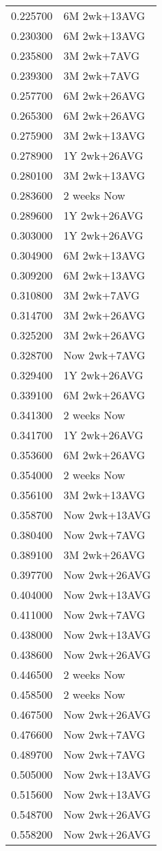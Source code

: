\begin{tabular}{rl}
0.225700 & 6M 2wk+13AVG \\
0.230300 & 6M 2wk+13AVG \\
0.235800 & 3M 2wk+7AVG \\
0.239300 & 3M 2wk+7AVG \\
0.257700 & 6M 2wk+26AVG \\
0.265300 & 6M 2wk+26AVG \\
0.275900 & 3M 2wk+13AVG \\
0.278900 & 1Y 2wk+26AVG \\
0.280100 & 3M 2wk+13AVG \\
0.283600 & 2 weeks Now \\
0.289600 & 1Y 2wk+26AVG \\
0.303000 & 1Y 2wk+26AVG \\
0.304900 & 6M 2wk+13AVG \\
0.309200 & 6M 2wk+13AVG \\
0.310800 & 3M 2wk+7AVG \\
0.314700 & 3M 2wk+26AVG \\
0.325200 & 3M 2wk+26AVG \\
0.328700 & Now 2wk+7AVG \\
0.329400 & 1Y 2wk+26AVG \\
0.339100 & 6M 2wk+26AVG \\
0.341300 & 2 weeks Now \\
0.341700 & 1Y 2wk+26AVG \\
0.353600 & 6M 2wk+26AVG \\
0.354000 & 2 weeks Now \\
0.356100 & 3M 2wk+13AVG \\
0.358700 & Now 2wk+13AVG \\
0.380400 & Now 2wk+7AVG \\
0.389100 & 3M 2wk+26AVG \\
0.397700 & Now 2wk+26AVG \\
0.404000 & Now 2wk+13AVG \\
0.411000 & Now 2wk+7AVG \\
0.438000 & Now 2wk+13AVG \\
0.438600 & Now 2wk+26AVG \\
0.446500 & 2 weeks Now \\
0.458500 & 2 weeks Now \\
0.467500 & Now 2wk+26AVG \\
0.476600 & Now 2wk+7AVG \\
0.489700 & Now 2wk+7AVG \\
0.505000 & Now 2wk+13AVG \\
0.515600 & Now 2wk+13AVG \\
0.548700 & Now 2wk+26AVG \\
0.558200 & Now 2wk+26AVG \\
\hline
\end{tabular}